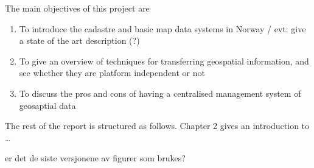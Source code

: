 





The main objectives of this project are
\begin{enumerate}
\item To introduce the cadastre and basic map data systems in Norway / evt: give a state of the art description (?)
\item To give an overview of techniques for transferring geospatial information, and see whether they are platform independent or not
\item To discuss the pros and cons of having a centralised management system of geosaptial data
\end{enumerate}



The rest of the report is structured as follows. Chapter 2 gives an introduction to \ldots

\todo er det de siste versjonene av figurer som brukes?




